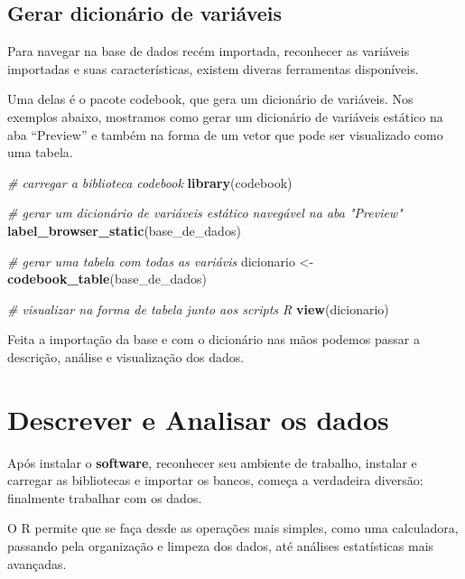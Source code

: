 \documentclass[
  brazil,
]{book}
\newenvironment{Shaded}{\begin{snugshade}}{\end{snugshade}}
\newcommand{\CommentTok}[1]{\textcolor[rgb]{0.56,0.35,0.01}{\textit{#1}}}
\newcommand{\KeywordTok}[1]{\textcolor[rgb]{0.13,0.29,0.53}{\textbf{#1}}}
\newcommand{\NormalTok}[1]{#1}
\newcommand{\StringTok}[1]{\textcolor[rgb]{0.31,0.60,0.02}{#1}}
\begin{document}
\hypertarget{gerar-dicionuxe1rio-de-variuxe1veis}{%
\section{Gerar dicionário de variáveis}\label{gerar-dicionuxe1rio-de-variuxe1veis}}

Para navegar na base de dados recém importada, reconhecer as variáveis importadas e suas características, existem diveras ferramentas disponíveis.

Uma delas é o pacote codebook, que gera um dicionário de variáveis. Nos exemplos abaixo, mostramos como gerar um dicionário de variáveis estático na aba ``Preview'' e também na forma de um vetor que pode ser visualizado como uma tabela.

\begin{Shaded}
\begin{Highlighting}[]
\CommentTok{# carregar a biblioteca codebook}
\KeywordTok{library}\NormalTok{(codebook)}

\CommentTok{# gerar um dicionário de variáveis estático navegável na aba "Preview"}
\KeywordTok{label_browser_static}\NormalTok{(base_de_dados)}

\CommentTok{# gerar uma tabela com todas as variávis}
\NormalTok{dicionario <-}\StringTok{ }\KeywordTok{codebook_table}\NormalTok{(base_de_dados)}

\CommentTok{# visualizar na forma de tabela junto aos scripts R}
\KeywordTok{view}\NormalTok{(dicionario)}
\end{Highlighting}
\end{Shaded}

Feita a importação da base e com o dicionário nas mãos podemos passar a descrição, análise e visualização dos dados.

\hypertarget{descrever-e-analisar-os-dados}{%
\chapter{Descrever e Analisar os dados}\label{descrever-e-analisar-os-dados}}

Após instalar o \textbf{software}, reconhecer seu ambiente de trabalho, instalar e carregar as bibliotecas e importar os bancos, começa a verdadeira diversão: finalmente trabalhar com os dados.

O R permite que se faça desde as operações mais simples, como uma calculadora, passando pela organização e limpeza dos dados, até análises estatísticas mais avançadas.
\end{document}
